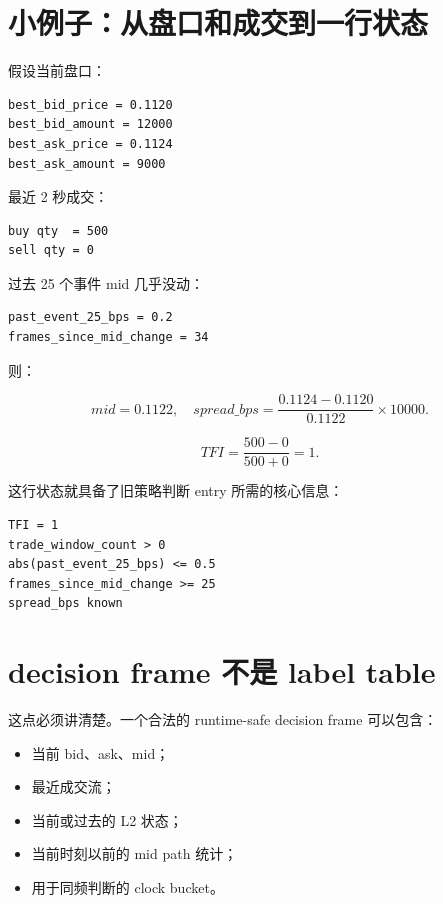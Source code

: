 
\section{小例子：从盘口和成交到一行状态}

假设当前盘口：

\begin{lstlisting}
best_bid_price = 0.1120
best_bid_amount = 12000
best_ask_price = 0.1124
best_ask_amount = 9000
\end{lstlisting}

最近 2 秒成交：

\begin{lstlisting}
buy qty  = 500
sell qty = 0
\end{lstlisting}

过去 25 个事件 mid 几乎没动：

\begin{lstlisting}
past_event_25_bps = 0.2
frames_since_mid_change = 34
\end{lstlisting}

则：

\[
mid = 0.1122,
\quad
spread\_bps = \frac{0.1124 - 0.1120}{0.1122} \times 10000.
\]

\[
TFI = \frac{500 - 0}{500 + 0} = 1.
\]

这行状态就具备了旧策略判断 entry 所需的核心信息：

\begin{lstlisting}
TFI = 1
trade_window_count > 0
abs(past_event_25_bps) <= 0.5
frames_since_mid_change >= 25
spread_bps known
\end{lstlisting}

\section{decision frame 不是 label table}

这点必须讲清楚。一个合法的 runtime-safe decision frame 可以包含：

\begin{itemize}[leftmargin=2em]
  \item 当前 bid、ask、mid；
  \item 最近成交流；
  \item 当前或过去的 L2 状态；
  \item 当前时刻以前的 mid path 统计；
  \item 用于同频判断的 clock bucket。
\end{itemize}

